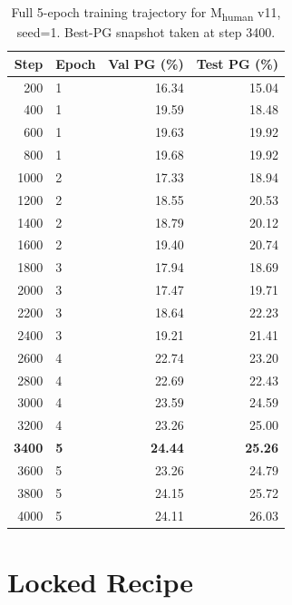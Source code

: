 \documentclass{article}
\begin{document}
\begin{table}[H]
\centering
\caption{Full 5-epoch training trajectory for M\textsubscript{human} v11,
seed=1. Best-PG snapshot taken at step 3400.}
\begin{tabular}{rlrr}
\toprule
Step & Epoch & Val PG (\%) & Test PG (\%) \\
\midrule
200  & 1 & 16.34 & 15.04 \\
400  & 1 & 19.59 & 18.48 \\
600  & 1 & 19.63 & 19.92 \\
800  & 1 & 19.68 & 19.92 \\
1000 & 2 & 17.33 & 18.94 \\
1200 & 2 & 18.55 & 20.53 \\
1400 & 2 & 18.79 & 20.12 \\
1600 & 2 & 19.40 & 20.74 \\
1800 & 3 & 17.94 & 18.69 \\
2000 & 3 & 17.47 & 19.71 \\
2200 & 3 & 18.64 & 22.23 \\
2400 & 3 & 19.21 & 21.41 \\
2600 & 4 & 22.74 & 23.20 \\
2800 & 4 & 22.69 & 22.43 \\
3000 & 4 & 23.59 & 24.59 \\
3200 & 4 & 23.26 & 25.00 \\
\textbf{3400} & \textbf{5} & \textbf{24.44} & \textbf{25.26} \\
3600 & 5 & 23.26 & 24.79 \\
3800 & 5 & 24.15 & 25.72 \\
4000 & 5 & 24.11 & 26.03 \\
\bottomrule
\end{tabular}
\end{table}

\section{Locked Recipe}
\label{app:recipe}
\end{document}
